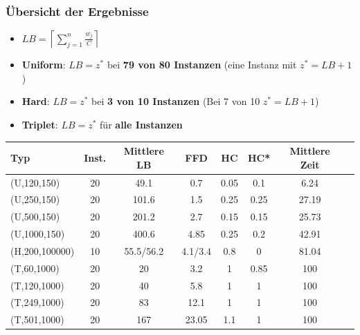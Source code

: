 \documentclass{beamer}
\begin{document}
\begin{frame}
\frametitle{Übersicht der Ergebnisse}
\begin{footnotesize}
\begin{itemize}
\item $LB = \left\lceil\sum_{j=1}^{n} \frac{w_j}{C}\right\rceil$
\item \textbf{Uniform}: $LB = z^{*}$ bei \textbf{79 von 80 Instanzen} (eine Instanz mit $z^{*} = LB + 1$)
\item \textbf{Hard}: $LB = z^{*}$ bei \textbf{3 von 10 Instanzen} (Bei 7 von 10 $z^{*} = LB + 1$) 
\item \textbf{Triplet}: $LB = z^{*}$ für \textbf{alle Instanzen} 
\end{itemize}
\end{footnotesize}

\begin{scriptsize}
\begin{table}
\begin{tabular}{l c c c c c c c}
\toprule
\textbf{Typ} & \textbf{Inst.} &  \textbf{Mittlere LB} & \textbf{FFD} & \textbf{HC} & \textbf{HC*}  & \textbf{Mittlere Zeit}\\
\midrule
(U,120,150)  & 20    & 49.1  & 0.7 & 0.05 & 0.1 & 6.24 \\
(U,250,150)  & 20     & 101.6  & 1.5 & 0.25 & 0.25 & 27.19 \\
(U,500,150)  & 20     & 201.2  & 2.7 & 0.15 & 0.15 &  25.73\\
(U,1000,150)  & 20     & 400.6  & 4.85 & 0.25 & 0.2 & 42.91\\ \midrule
(H,200,100000)  & 10     & 55.5/56.2  & 4.1/3.4 & 0.8 & 0 & 81.04 \\\midrule
(T,60,1000)  & 20      & 20  & 3.2 & 1 & 0.85 & 100 \\
(T,120,1000)  & 20     & 40  & 5.8 & 1 &1& 100 \\
(T,249,1000)  & 20     & 83  & 12.1 & 1 &1& 100 \\
(T,501,1000)  & 20     & 167  & 23.05 & 1.1 &1& 100 \\
\bottomrule
\end{tabular}
\end{table}
\end{scriptsize}

\end{frame}


\end{document}
